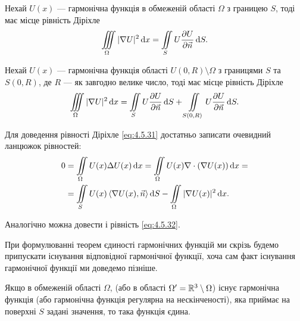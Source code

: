 Нехай $U(x)$ --- гармонічна функція в обмеженій області $\Omega$ з границею $S$, тоді має місце рівність Діріхле
\begin{equation}
	\label{eq:4.5.31}
	\displaystyle\iiint\limits_\Omega |\nabla U|^2 \mathop{}\!\mathrm{d} x = \displaystyle\iint\limits_S U \frac{\partial U}{\partial \vec n} \mathop{}\!\mathrm{d} S.
\end{equation}

Нехай $U(x)$ --- гармонічна функція області $U(0, R) \setminus \Omega$ з границями $S$ та $S(0, R)$, де $R$ --- як завгодно велике число, тоді має місце рівність Діріхле
\begin{equation}
	\label{eq:4.5.32}
	\displaystyle\iiint\limits_\Omega |\nabla U|^2 \mathop{}\!\mathrm{d} x = \displaystyle\iint\limits_S U \frac{\partial U}{\partial \vec n} \mathop{}\!\mathrm{d} S + \displaystyle\iint\limits_{S(0,R)} U \frac{\partial U}{\partial \vec n} \mathop{}\!\mathrm{d} S.
\end{equation}

Для доведення рівності Діріхле \eqref{eq:4.5.31} достатньо записати очевидний ланцюжок рівностей:
\begin{equation}
	\begin{aligned}
		0 &= \Iint_\Omega U(x) \Delta U(x) \diff x = \Iint_\Omega U(x) \nabla \cdot (\nabla U(x)) \diff x = \\
		&= \Iint_S U(x) \langle \nabla U(x), \vec n \rangle \diff S - \Iint_\Omega |\nabla U(x)|^2 \diff x.
	\end{aligned}
\end{equation}

Аналогічно можна довести і рівність \eqref{eq:4.5.32}. \medskip

При формулюванні теорем єдиності гармонічних функцій ми скрізь будемо припускати існування відповідної гармонічної функції, хоча сам факт існування гармонічної функції ми доведемо пізніше.

\begin{theorem}
	Якщо в обмеженій області $\Omega$, (або в області $\Omega' = \mathbb{R}^3 \setminus \Omega$) існує гармонічна функція (або гармонічна функція регулярна на нескінченості), яка приймає на поверхні $S$ задані значення, то така функція єдина.
\end{theorem}

